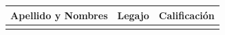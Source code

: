 \documentclass[12pt]{article} %
\begin{document}
\newpage

\noindent
  \begin{center}
   \begin{tabular}{| c | c | c |}
    \hline
     Apellido y Nombres \hspace{8cm} &  Legajo & {Calificación} \\ \hline 
      &	& \\ \hline
   \end{tabular}	
  \end{center}

\noindent

\end{document}
